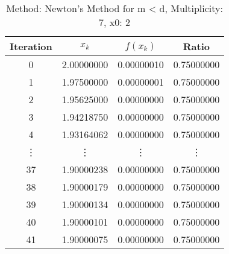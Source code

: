 \begin{table}
\centering
\caption{Method: Newton's Method for m < d, Multiplicity: 7, x0: 2}
\label{tab:table_Newton's_Method_for_m_<_d_7_2}
\begin{tabular}{c c c c}
\toprule
Iteration &      $x_k$ &   $f(x_k)$ &      Ratio \\
\midrule
        0 & 2.00000000 & 0.00000010 & 0.75000000 \\
        1 & 1.97500000 & 0.00000001 & 0.75000000 \\
        2 & 1.95625000 & 0.00000000 & 0.75000000 \\
        3 & 1.94218750 & 0.00000000 & 0.75000000 \\
        4 & 1.93164062 & 0.00000000 & 0.75000000 \\
   \vdots &     \vdots &     \vdots &     \vdots \\
       37 & 1.90000238 & 0.00000000 & 0.75000000 \\
       38 & 1.90000179 & 0.00000000 & 0.75000000 \\
       39 & 1.90000134 & 0.00000000 & 0.75000000 \\
       40 & 1.90000101 & 0.00000000 & 0.75000000 \\
       41 & 1.90000075 & 0.00000000 & 0.75000000 \\
\bottomrule
\end{tabular}
\end{table}
